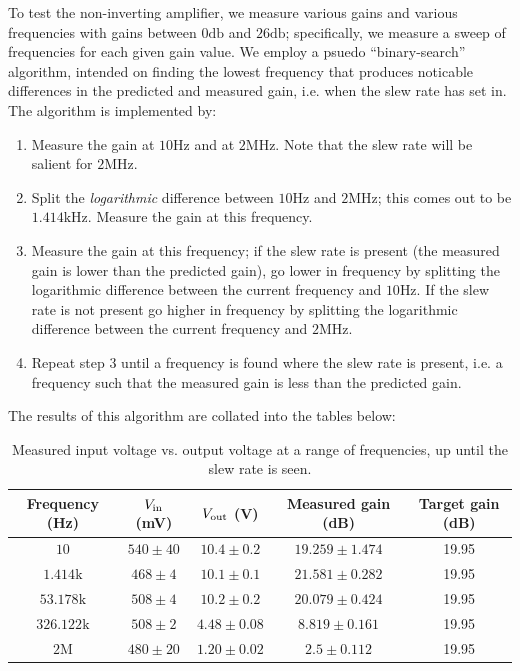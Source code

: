 \documentclass[11pt]{article}
\begin{document}
To test the non-inverting amplifier, we measure various gains
and various frequencies with gains between $0 \si{\decibel}$ and 
$26 \si{\decibel}$; specifically, we measure
a sweep of frequencies for each given gain value. We employ a psuedo
``binary-search'' algorithm, intended on finding the lowest frequency
that produces noticable differences in the predicted and measured gain,
i.e. when the slew rate has set in. The algorithm is implemented by:
\begin{enumerate}
	\label{binary_search}
	\item Measure the gain at $10\si{\hertz}$ and at $2\si{\mega \hertz}$. 
	Note that the slew rate will be salient for $2\si{\mega \hertz}$.
	\item Split the \emph{logarithmic} difference between $10\si{\hertz}$
	and $2\si{\mega \hertz}$; this comes out to be $1.414\si{\kilo\hertz}$.
	Measure the gain at this frequency.
	\item Measure the gain at this frequency; if the slew rate is present
	(the measured gain is lower than the predicted gain), go lower
	in frequency by splitting the logarithmic difference between
	the current frequency and $10\si{\hertz}$. If the slew rate is 
	not present go higher in frequency by splitting the logarithmic 
	difference between the current frequency and $2\si{\mega\hertz}$.
	\item Repeat step 3 until a frequency is found where the slew
	rate is present, i.e. a frequency such that the measured gain
	is less than the predicted gain.
\end{enumerate}
The results of this algorithm are collated into the tables
below:

\begin{table}[H]
	\centering
	\begin{tabular}{|c|c|c|c|c|}
	\hline
	Frequency (Hz)    & $V_{\rm in}$ (mV) & $V_{\rm out}$ (V) & Measured gain (dB) & Target gain (dB) \\
	\hline
	$10$              & $540 \pm 40$     & $10.4 \pm 0.2$    & $19.259 \pm 1.474$ & 19.95            \\
	$1.414\text{k}$   & $468 \pm 4$      & $10.1 \pm 0.1$    & $21.581 \pm 0.282$ & 19.95            \\
	$53.178\text{k}$  & $508 \pm 4$      & $10.2 \pm 0.2$    & $20.079 \pm 0.424$ & 19.95            \\
	$326.122\text{k}$ & $508 \pm 2$      & $4.48 \pm 0.08$   & $8.819 \pm 0.161$  & 19.95            \\
	$2\text{M}$       & $480 \pm 20$     & $1.20 \pm 0.02$   & $2.5 \pm 0.112$    & 19.95            \\
	\hline
	\end{tabular}
	\caption{Measured input voltage vs. output voltage at a range of
	frequencies, up until the slew rate is seen.}
\end{table}
\end{document}
